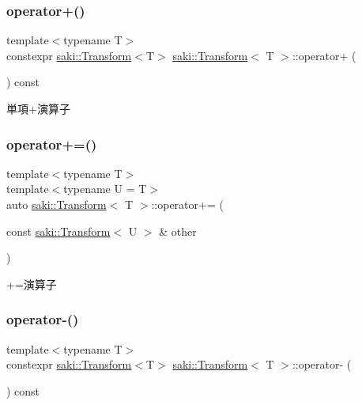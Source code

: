 \subsubsection{\texorpdfstring{operator+()}{operator+()}}
{\footnotesize\ttfamily template$<$typename T$>$ \\
constexpr \mbox{\hyperlink{classsaki_1_1_transform}{saki\+::\+Transform}}$<$T$>$ \mbox{\hyperlink{classsaki_1_1_transform}{saki\+::\+Transform}}$<$ T $>$\+::operator+ (\begin{DoxyParamCaption}{ }\end{DoxyParamCaption}) const\hspace{0.3cm}{\ttfamily [inline]}}



単項+演算子 

\mbox{\label{classsaki_1_1_transform_a07df3fb4b31770e31777c7d54c15d3ea}} 
\subsubsection{\texorpdfstring{operator+=()}{operator+=()}}
{\footnotesize\ttfamily template$<$typename T$>$ \\
template$<$typename U  = T$>$ \\
auto \mbox{\hyperlink{classsaki_1_1_transform}{saki\+::\+Transform}}$<$ T $>$\+::operator+= (\begin{DoxyParamCaption}\item[{const \mbox{\hyperlink{classsaki_1_1_transform}{saki\+::\+Transform}}$<$ U $>$ \&}]{other }\end{DoxyParamCaption})\hspace{0.3cm}{\ttfamily [inline]}}



+=演算子 

\mbox{\label{classsaki_1_1_transform_a771da4173222f8200bfdfee101be1e28}} 
\subsubsection{\texorpdfstring{operator-\/()}{operator-()}}
{\footnotesize\ttfamily template$<$typename T$>$ \\
constexpr \mbox{\hyperlink{classsaki_1_1_transform}{saki\+::\+Transform}}$<$T$>$ \mbox{\hyperlink{classsaki_1_1_transform}{saki\+::\+Transform}}$<$ T $>$\+::operator-\/ (\begin{DoxyParamCaption}{ }\end{DoxyParamCaption}) const\hspace{0.3cm}{\ttfamily [inline]}}



